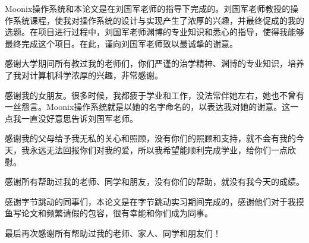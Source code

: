 \begin{acknowledgements}

Moonix操作系统和本论文是在刘国军老师的指导下完成的。刘国军老师教授的操作系统课程，使我对操作系统的设计与实现产生了浓厚的兴趣，并最终促成的我的选题。在项目进行过程中，刘国军老师渊博的专业知识和悉心的指导，使得我能够最终完成这个项目。在此，谨向刘国军老师致以最诚挚的谢意。

感谢大学期间所有教过我的老师们，你们严谨的治学精神、渊博的专业知识，培养了我对计算机科学浓厚的兴趣，非常感谢。

感谢我的女朋友。很多时候，我都疲于学业和工作，没法常伴她左右，她也不曾有一丝怨言。Moonix操作系统就是以她的名字命名的，以表达我对她的谢意。这一点我一直没好意思告诉刘国军老师。

感谢我的父母给予我无私的关心和照顾，没有你们的照顾和支持，就不会有我的今天，我永远无法回报你们对我的爱，所以我希望能顺利完成学业，给你们一点欣慰。

感谢所有帮助过我的老师、同学和朋友，没有你们的帮助，就没有我今天的成绩。

感谢字节跳动的同事们，本论文是在字节跳动实习期间完成的，感谢他们对于我摸鱼写论文和频繁请假的包容，很有幸能和你们成为同事。

最后再次感谢所有帮助过我的老师、家人、同学和朋友们！

\end{acknowledgements}
